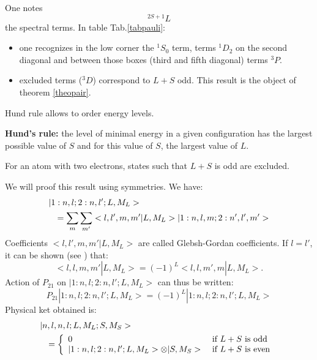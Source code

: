 \documentclass[12pt]{book}
\begin{document}
\begin{exmp}
\begin{table}[hbt]
\begin{center}
\begin{tabular}{|r|r|r|r|r|r|r|r|l|}
\cline{1-2}
\end{tabular}
\end{center}
\end{table}
One notes
\begin{equation}
^{2S+1}L
\end{equation}
the spectral terms. In table Tab.\ref{tabpauli}:
\begin{itemize}
\item one recognizes in the low corner the $^1S_0$ term, terms $^1D_2$ on the
  second diagonal and between those boxes (third and fifth diagonal) terms
  $^3P$. 
\item  excluded terms ($^3D$) correspond to 
$L+S$ odd. This result is the object of theorem \ref{theopair}.
\end{itemize}
Hund rule allows to order energy levels.
\begin{postulat}
{\bf Hund's rule:} the level of minimal energy in a given configuration has
the largest possible value of $S$ and for this value of $S$, the largest value
of $L$.
\end{postulat}   
\end{exmp}

\begin{thm}\label{theopair}
For an atom with two electrons, states such that $L+S$ is odd are excluded.
\end{thm}
\begin{pf}
We will proof this result using symmetries. We have:
\begin{eqnarray}
\lefteqn{|1:n,l;2:n,l';L,M_L\mathrel{>} } \nonumber\\
& &=\sum_m \sum_{m'}  \mathrel{<} l,l',m,m'|L,M_L\mathrel{>}
|1:n,l,m;2:n',l',m'\mathrel{>}  
\end{eqnarray}
Coefficients $  \mathrel{<} l,l',m,m'|L,M_L\mathrel{>} $ are called 
Glebsh-Gordan  coefficients. If $l=l'$, it
can be shown (see 
\cite{ph:mecaq:Cohen73}) that:
\begin{equation}
  \mathrel{<} l,l,m,m'|L,M_L\mathrel{>} =(-1)^L \mathrel{<} l,l,m',m|L,M_L\mathrel{>}.
\end{equation}
Action of $P_{21}$ on
$|1:n,l;2:n,l';L,M_L\mathrel{>} $ can thus be written:
\begin{equation}
P_{21}|1:n,l;2:n,l';L,M_L\mathrel{>} =(-1)^L|1:n,l;2:n,l';L,M_L\mathrel{>} 
\end{equation}
Physical ket obtained is:
\begin{eqnarray}
\lefteqn{|n,l,n,l;L,M_L;S,M_S\mathrel{>} }\nonumber\\
& &= \left\{
\begin{array}{ll}
0&\mbox{ if  }L+S\mbox{ is odd }\\
|1:n,l;2:n,l';L,M_L\mathrel{>} \otimes |S,M_S\mathrel{>} &\mbox{ if  }L+S\mbox{ is even }
\end{array} 
\right.
\end{eqnarray}
\end{pf}
\end{document}
